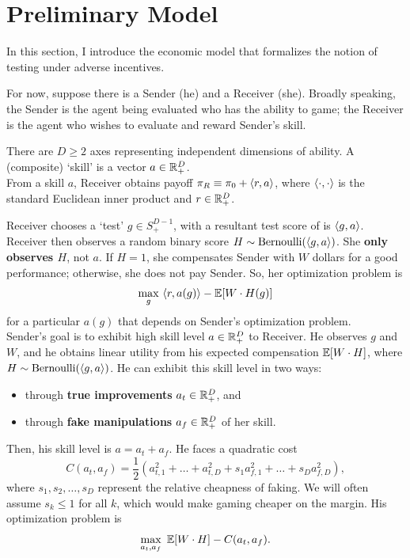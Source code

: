 \section{Preliminary Model}
\label{sec:preliminary-model}

In this section, I introduce the economic model that formalizes the notion of testing under adverse incentives.

For now, suppose there is a Sender (he) and a Receiver (she). Broadly speaking, the Sender is the agent being evaluated who has the ability to game; the Receiver is the agent who wishes to evaluate and reward Sender's skill.


There are $D \geq 2$ axes representing independent dimensions of ability. A (composite) `skill' is a vector $a \in \mathbb{R} ^D_+$.\\

\noindent From a skill $a$, Receiver obtains payoff $\pi_R \equiv \pi_0+\langle r,a\rangle$, where $\langle\cdot, \cdot\rangle$ is the standard Euclidean inner product and $r \in \mathbb{R}^D_+$.

Receiver chooses a `test' $g \in S^{D-1}_+$, with a resultant test score of is $\langle g,a\rangle$. Receiver then observes a random binary score $H \sim \text{Bernoulli}(\langle g,a\rangle)$. She \textbf{only observes $H$}, not $a$. If $H = 1$, she compensates Sender with $W$ dollars for a good performance; otherwise, she does not pay Sender. So, her optimization problem is $$\max_g \ \<r,a(g)\> - \bbE[W \cdot H(g)]$$ for a particular $a(g)$ that depends on Sender's optimization problem.\\

\noindent
Sender's goal is to exhibit high skill level $a \in \mathbb{R}^D_+$ to Receiver. He observes $g$ and $W$, and he obtains linear utility from his expected compensation $\mathbb{E}[W \cdot H]$, where $H \sim \text{Bernoulli}(\langle g,a\rangle)$. He can exhibit this skill level in two ways:
\begin{itemize}[nosep]
    \item through \textbf{true improvements} $a_t \in \mathbb{R} ^D_+$, and
    \item through \textbf{fake manipulations} $a_f \in \mathbb{R}^D_+$ of her skill.
\end{itemize}

Then, his skill level is $a=a_t+a_f$. He faces a quadratic cost $$C(a_t,a_f)=\dfrac 1 2\left(a_{t,1}^2+\dots+a_{t,D}^2+s_1a_{f,1}^2+\dots +s_Da_{f,D}^2\right),$$ where $s_1,s_2,\dots,s_D$ represent the relative cheapness of faking. We will often assume $s_k \leq 1$ for all $k$, which would make gaming cheaper on the margin. His optimization problem is $$\max_{a_t,a_f} \ \mathbb{E}[W \cdot H]-C(a_t,a_f).$$

